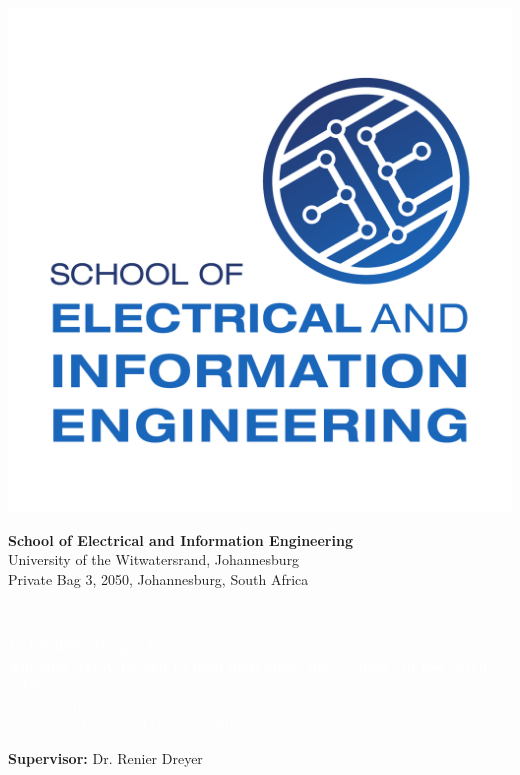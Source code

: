 \documentclass[11pt]{witseiepaper}
\begin{document}
\begin{bibunit}[witseie]


\thispagestyle{empty}
\pagestyle{plain}
\onecolumn
\begin{minipage}{0.16\textwidth}
    \includegraphics[width=\textwidth,height=\textwidth]{logo.pdf}
\end{minipage}
\begin{minipage}{0.8\textwidth}
    \centering
    \textbf{\Large School of Electrical and Information Engineering}\\
    {\large University of the Witwatersrand, Johannesburg}\\
    {\small Private Bag 3, 2050, Johannesburg, South Africa}\\
\end{minipage}
\vspace{.3cm}\\
\colorbox{myblue}{\begin{minipage}{0.98\textwidth}
        \begin{center}
        	\centering
            \textcolor{white}{\textbf{\Large{ELEN4000: Design Project}}\\
                \textbf{Antenna Array Design to map man made space “junk” in low earth orbit}\\
                October 2018 \\
                Submission Date: 23rd October, 2018
            }
        \end{center}
    \end{minipage}
}
\vspace{3cm}
\begin{center}
\textbf{Supervisor:} Dr. Renier Dreyer\\


\end{center}
\end{bibunit}
\end{document}
